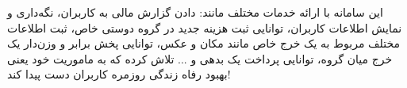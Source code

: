 این سامانه با ارائه خدمات مختلف مانند: دادن گزارش مالی به کاربران، نگه‌داری و نمایش اطلاعات کاربران، توانایی ثبت هزینه جدید در گروه دوستی خاص، ثبت اطلاعات مختلف مربوط به یک خرج خاص مانند مکان و عکس، توانایی پخش برابر و وزن‌دار یک خرج میان گروه، توانایی پرداخت یک بدهی و ... تلاش کرده که به ماموریت خود یعنی بهبود رفاه زندگی روزمره کاربران دست پیدا کند!

%
%
%
%
%
%
%
%
%
%
%
%
